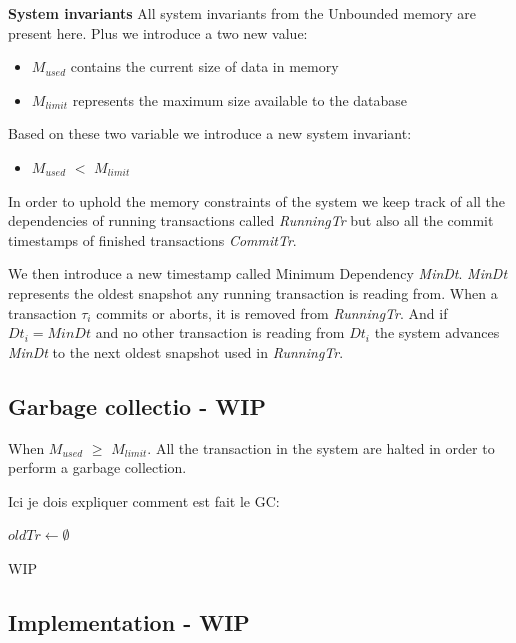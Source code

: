 \documentclass[systeme,french,english]{compas2022}
\begin{document}
\textbf{System invariants}
All system invariants from the Unbounded memory are present here.
Plus we introduce a two new value:
\begin{itemize}
  \item \emph{$M_{used}$} contains the current size of data in memory
  \item \emph{$M_{limit}$} represents the maximum size available to the database
\end{itemize}
Based on these two variable we introduce a new system invariant:
\begin{itemize}
  \item \emph{$M_{used}$} $<$ \emph{$M_{limit}$}
\end{itemize}
In order to uphold the memory constraints of the system we keep track of all the dependencies of running transactions called \emph{RunningTr} but also all the commit timestamps of finished transactions \emph{CommitTr}.

We then introduce a new timestamp called Minimum Dependency \emph{MinDt}.
\emph{MinDt} represents the oldest snapshot any running transaction is reading from.
When a transaction $\tau_i$ commits or aborts, it is removed from \emph{RunningTr}. 
And if $Dt_i = MinDt$ and no other transaction is reading from $Dt_i$ the system advances \emph{MinDt} to the next oldest snapshot used in \emph{RunningTr}.



\subsection{Garbage collectio - WIP}
When \emph{$M_{used}$} $\geq$ \emph{$M_{limit}$}. 
All the transaction in the system are halted in order to perform a garbage collection.

Ici je dois expliquer comment est fait le GC:\\
\begin{algorithm}
  \(oldTr \longleftarrow \emptyset\)\;
\end{algorithm}

WIP


\subsection{Implementation - WIP}
\end{document}
